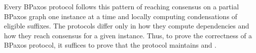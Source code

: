 Every BPaxos protocol follows this pattern of reaching consensus on a partial
BPaxos graph one instance at a time and locally computing condensations of
eligible suffixes. The protocols differ only in how they compute dependencies
and how they reach consensus for a given instance. Thus, to prove the
correctness of a BPaxos protocol, it suffices to prove that the protocol
maintains  and .
